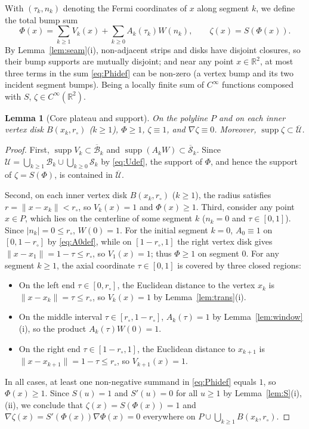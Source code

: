 \documentclass[11pt]{article}
\newtheorem{lemma}[theorem]{Lemma}
\newcommand{\R}{\mathbb{R}}
\begin{document}
With $(\tau_k, n_k)$ denoting the Fermi coordinates of $x$ along segment $k$, we define the total bump sum
\begin{equation}
\label{eq:Phidef}
\Phi(x) = \sum_{k\ge 1} V_k(x) + \sum_{k\ge 0} A_k(\tau_k) W(n_k), \qquad \zeta(x) = S(\Phi(x)).
\end{equation}
By Lemma~\ref{lem:seam}(i), non-adjacent strips and disks have disjoint closures, so their bump supports are mutually disjoint; and near any point $x \in \R^2$, at most three terms in the sum \eqref{eq:Phidef} can be non-zero (a vertex bump and its two incident segment bumps).
Being a locally finite sum of $C^\infty$ functions composed with $S$, $\zeta \in C^\infty(\R^2)$.

\begin{lemma}[Core plateau and support]
\label{lem:core}
On the polyline $P$ and on each inner vertex disk $B(x_k, r_\circ)$ ($k \ge 1$), $\Phi \ge 1$, $\zeta \equiv 1$, and $\nabla\zeta \equiv 0$.
Moreover, $\operatorname{supp}\zeta \subset \overline{\mathcal U}$.
\end{lemma}

\begin{proof}
First, $\operatorname{supp} V_k \subset \overline{\mathcal B}_k$ and $\operatorname{supp}(A_k W) \subset \overline{\mathcal S}_k$.
Since $\mathcal U = \bigcup_{k\ge 1}\mathcal B_k \cup \bigcup_{k\ge 0}\mathcal S_k$ by \eqref{eq:Udef}, the support of $\Phi$, and hence the support of $\zeta = S(\Phi)$, is contained in $\overline{\mathcal U}$.

Second, on each inner vertex disk $B(x_k, r_\circ)$ ($k \ge 1$), the radius satisfies $r = \|x-x_k\| < r_\circ$, so $V_k(x) = 1$ and $\Phi(x) \ge 1$.
Third, consider any point $x \in P$, which lies on the centerline of some segment $k$ ($n_k = 0$ and $\tau \in [0, 1]$).
Since $|n_k| = 0 \le r_\circ$, $W(0) = 1$.
For the initial segment $k=0$, $A_0 \equiv 1$ on $[0, 1-r_\circ]$ by \eqref{eq:A0def}, while on $[1-r_\circ, 1]$ the right vertex disk gives $\|x-x_1\| = 1-\tau \le r_\circ$, so $V_1(x) = 1$; thus $\Phi \ge 1$ on segment $0$.
For any segment $k \ge 1$, the axial coordinate $\tau \in [0, 1]$ is covered by three closed regions:
\begin{itemize}
\item On the left end $\tau \in [0, r_\circ]$, the Euclidean distance to the vertex $x_k$ is $\|x-x_k\| = \tau \le r_\circ$, so $V_k(x) = 1$ by Lemma~\ref{lem:trans}(i).
\item On the middle interval $\tau \in [r_\circ, 1-r_\circ]$, $A_k(\tau) = 1$ by Lemma~\ref{lem:window}(i), so the product $A_k(\tau)W(0) = 1$.
\item On the right end $\tau \in [1-r_\circ, 1]$, the Euclidean distance to $x_{k+1}$ is $\|x-x_{k+1}\| = 1-\tau \le r_\circ$, so $V_{k+1}(x) = 1$.
\end{itemize}
In all cases, at least one non-negative summand in \eqref{eq:Phidef} equals $1$, so $\Phi(x) \ge 1$.
Since $S(u) = 1$ and $S'(u) = 0$ for all $u \ge 1$ by Lemma~\ref{lem:S}(i),(ii), we conclude that $\zeta(x) = S(\Phi(x)) = 1$ and $\nabla\zeta(x) = S'(\Phi(x))\nabla\Phi(x) = 0$ everywhere on $P \cup \bigcup_{k\ge1} B(x_k, r_\circ)$.
\end{proof}
\end{document}
